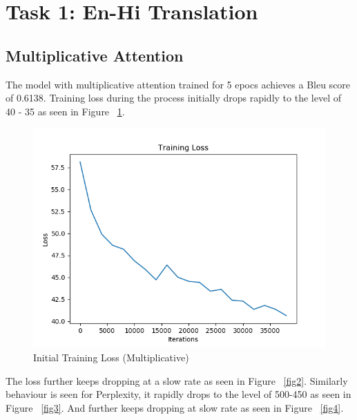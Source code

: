 \documentclass[11pt,a4paper]{article}
\begin{document}
\section{Task 1: En-Hi Translation}


\subsection{Multiplicative Attention}
The model with multiplicative attention trained for 5 epocs achieves a Bleu score of 0.6138.
Training loss during the process initially drops rapidly to the level of 40 - 35 as seen in Figure ~\ref{fig1}. 

\begin{figure}[!htbp]
\includegraphics[width=\linewidth]{hi_mul_loss_1.png}
\caption{Initial Training Loss (Multiplicative)}
\label{fig1}
\end{figure}

The loss further keeps dropping at a slow rate as seen in Figure ~\ref{fig2}. Similarly behaviour is seen for Perplexity, it rapidly drops to the level of 500-450 as seen in Figure ~\ref{fig3}. And further keeps dropping at slow rate as seen in Figure ~\ref{fig4}.

\end{document}
